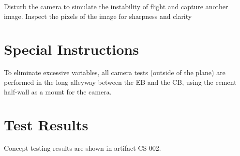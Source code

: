 \documentclass[]{auvsi_doc}
\begin{document}
Disturb the camera to simulate the instability of flight and capture another image. Inspect the pixels of the image for sharpness and clarity

\section{Special Instructions}

To eliminate excessive variables, all camera tests (outside of the plane) are performed in the long alleyway between the EB and the CB, using the cement half-wall as a mount for the camera.

\section{Test Results}

Concept testing results are shown in artifact CS-002.
\end{document}
